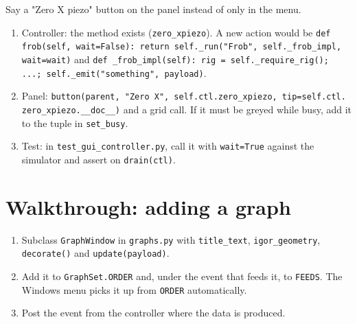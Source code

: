 Say a "Zero X piezo" button on the panel instead of only in the menu.

\begin{enumerate}[leftmargin=*]
\item Controller: the method exists (\texttt{zero\_\discretionary{}{}{}xpiezo}). A new action would be \texttt{def frob(self,\discretionary{}{}{} wait=False): return self.\discretionary{}{}{}\_\discretionary{}{}{}run("Frob",\discretionary{}{}{} self.\discretionary{}{}{}\_\discretionary{}{}{}frob\_\discretionary{}{}{}impl,\discretionary{}{}{} wait=wait)} and \texttt{def \_\discretionary{}{}{}frob\_\discretionary{}{}{}impl(self): rig = self.\discretionary{}{}{}\_\discretionary{}{}{}require\_\discretionary{}{}{}rig(); .\discretionary{}{}{}.\discretionary{}{}{}.\discretionary{}{}{}; self.\discretionary{}{}{}\_\discretionary{}{}{}emit("something",\discretionary{}{}{} payload)}.
\item Panel: \texttt{button(parent,\discretionary{}{}{} "Zero X",\discretionary{}{}{} self.\discretionary{}{}{}ctl.\discretionary{}{}{}zero\_\discretionary{}{}{}xpiezo,\discretionary{}{}{} tip=self.\discretionary{}{}{}ctl.\discretionary{}{}{} zero\_\discretionary{}{}{}xpiezo.\discretionary{}{}{}\_\discretionary{}{}{}\_\discretionary{}{}{}doc\_\discretionary{}{}{}\_\discretionary{}{}{})} and a grid call. If it must be greyed while busy, add it to the tuple in \texttt{set\_\discretionary{}{}{}busy}.
\item Test: in \texttt{test\_\discretionary{}{}{}gui\_\discretionary{}{}{}controller.\discretionary{}{}{}py}, call it with \texttt{wait=True} against the simulator and assert on \texttt{drain(ctl)}.
\end{enumerate}

\section{Walkthrough: adding a graph}

\begin{enumerate}[leftmargin=*]
\item Subclass \texttt{Graph\discretionary{}{}{}Window} in \texttt{graphs.\discretionary{}{}{}py} with \texttt{title\_\discretionary{}{}{}text}, \texttt{igor\_\discretionary{}{}{}geometry}, \texttt{decorate()} and \texttt{update(payload)}.
\item Add it to \texttt{Graph\discretionary{}{}{}Set.\discretionary{}{}{}ORDER} and, under the event that feeds it, to \texttt{FEEDS}. The Windows menu picks it up from \texttt{ORDER} automatically.
\item Post the event from the controller where the data is produced.
\end{enumerate}

